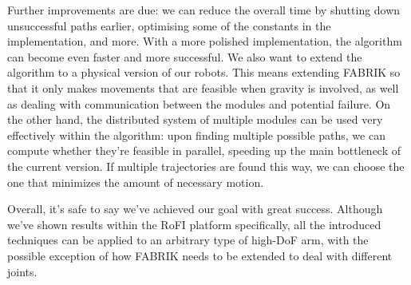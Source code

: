 Further improvements are due: we can reduce the overall time by shutting down unsuccessful paths earlier, optimising some of the constants in the implementation, and more. With a more polished implementation, the algorithm can become even faster and more successful. We also want to extend the algorithm to a physical version of our robots. This means extending FABRIK so that it only makes movements that are feasible when gravity is involved, as well as dealing with communication between the modules and potential failure. On the other hand, the distributed system of multiple modules can be used very effectively within the algorithm: upon finding multiple possible paths, we can compute whether they're feasible in parallel, speeding up the main bottleneck of the current version. If multiple trajectories are found this way, we can choose the one that minimizes the amount of necessary motion.

Overall, it's safe to say we've achieved our goal with great success. Although we've shown results within the RoFI platform specifically, all the introduced techniques can be applied to an arbitrary type of high-DoF arm, with the possible exception of how FABRIK needs to be extended to deal with different joints.
